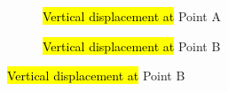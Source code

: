     \begin{figure}[htb]
        \begin{subfigure}[b]{1\linewidth}
            \centering
            \caption{\hl{Vertical displacement at} Point A}
        \end{subfigure}
    
        \begin{subfigure}[b]{1\linewidth}
            \centering
            \caption{\hl{Vertical displacement at} Point B}
        \end{subfigure}
    \end{figure}
